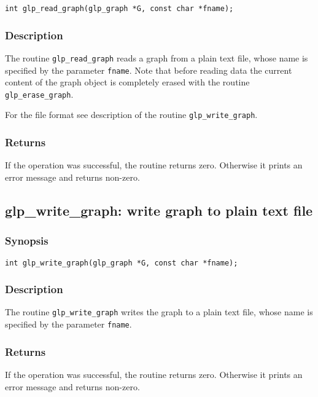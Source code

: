 \begin{verbatim}
int glp_read_graph(glp_graph *G, const char *fname);
\end{verbatim}

\subsubsection*{Description}

The routine \verb|glp_read_graph| reads a graph from a plain text file,
whose name is specified by the parameter \verb|fname|. Note that before
reading data the current content of the graph object is completely
erased with the routine \verb|glp_erase_graph|.

For the file format see description of the routine
\verb|glp_write_graph|.

\subsubsection*{Returns}

If the operation was successful, the routine returns zero. Otherwise
it prints an error message and returns non-zero.

\subsection{glp\_write\_graph: write graph to plain text file}

\subsubsection*{Synopsis}

\begin{verbatim}
int glp_write_graph(glp_graph *G, const char *fname);
\end{verbatim}

\subsubsection*{Description}

The routine \verb|glp_write_graph| writes the graph to a plain text
file, whose name is specified by the parameter \verb|fname|.

\subsubsection*{Returns}

If the operation was successful, the routine returns zero. Otherwise
it prints an error message and returns non-zero.

